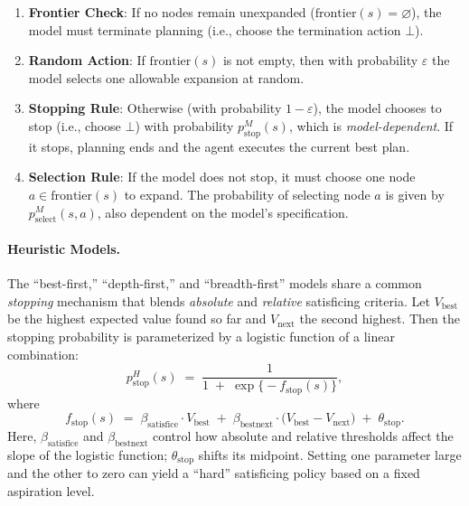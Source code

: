 \documentclass[a4paper,12pt,oneside,article]{memoir}
\begin{document}
\begin{enumerate}
    \item \textbf{Frontier Check}: If no nodes remain unexpanded 
    (\(\mathrm{frontier}(s) = \varnothing\)), the model must terminate 
    planning (i.e., choose the termination action \(\bot\)).

    \item \textbf{Random Action}: If \(\mathrm{frontier}(s)\) is not empty, 
    then with probability \(\varepsilon\) the model selects one allowable 
    expansion at random.

    \item \textbf{Stopping Rule}: Otherwise (with probability \(1-\varepsilon\)), 
    the model chooses to stop (i.e., choose \(\bot\)) with probability 
    \(p_{\mathrm{stop}}^{M}(s)\), which is \emph{model-dependent}. If it stops, 
    planning ends and the agent executes the current best plan.

    \item \textbf{Selection Rule}: If the model does not stop, it must choose 
    one node \(a \in \mathrm{frontier}(s)\) to expand. The probability of 
    selecting node \(a\) is given by \(p_{\mathrm{select}}^{M}(s,a)\), 
    also dependent on the model’s specification.
\end{enumerate}

\paragraph{Heuristic Models.}
The “best-first,” “depth-first,” and “breadth-first” models
share a common \emph{stopping} mechanism that blends
\emph{absolute} and \emph{relative} satisficing criteria. Let
\(V_{\mathrm{best}}\) be the highest expected value found
so far and \(V_{\mathrm{next}}\) the second highest. Then
the stopping probability is parameterized by a logistic function
of a linear combination:
\begin{equation}
p_{\mathrm{stop}}^{H}(s) \;=\;
  \frac{1}{1 \;+\; \exp\bigl\{-f_{\mathrm{stop}}(s)\bigr\}},
\label{eq:pStopH}
\end{equation}
where
\begin{equation}
f_{\mathrm{stop}}(s)
\;=\;
\beta_{\mathrm{satisfice}}\cdot V_{\mathrm{best}}
\;+\;
\beta_{\mathrm{bestnext}} \cdot \bigl(V_{\mathrm{best}} - V_{\mathrm{next}}\bigr)
\;+\;
\theta_{\mathrm{stop}}.
\end{equation}
Here, \(\beta_{\mathrm{satisfice}}\) and
\(\beta_{\mathrm{bestnext}}\) control how absolute and
relative thresholds affect the slope of the logistic function;
\(\theta_{\mathrm{stop}}\) shifts its midpoint. Setting one
parameter large and the other to zero can yield a “hard”
satisficing policy based on a fixed aspiration level.
\end{document}
